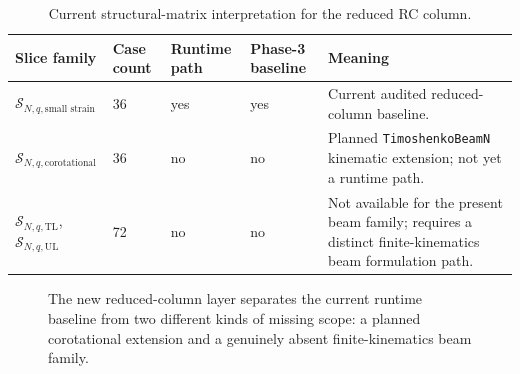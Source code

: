 \begin{table}[htbp]
  \centering
  \caption{Current structural-matrix interpretation for the reduced RC column.}
  \label{tab:reduced-rc-column-structural-matrix}
  \small
  \begin{tabular}{@{}p{}p{}p{}p{}p{}@{}}
    \toprule
    \textbf{Slice family} & \textbf{Case count} & \textbf{Runtime path} &
    \textbf{Phase-3 baseline} & \textbf{Meaning} \\
    \midrule
    \(\mathcal{S}_{N,q,\text{small strain}}\)
    & 36 & yes & yes
    & Current audited reduced-column baseline. \\

    \(\mathcal{S}_{N,q,\text{corotational}}\)
    & 36 & no & no
    & Planned \texttt{TimoshenkoBeamN} kinematic extension; not yet a runtime
      path. \\

    \(\mathcal{S}_{N,q,\text{TL}}\),
    \(\mathcal{S}_{N,q,\text{UL}}\)
    & 72 & no & no
    & Not available for the present beam family; requires a distinct
      finite-kinematics beam formulation path. \\
    \bottomrule
  \end{tabular}
\end{table}

\begin{figure}[htbp]
  \centering
  \caption{The new reduced-column layer separates the current runtime baseline
  from two different kinds of missing scope: a planned corotational extension
  and a genuinely absent finite-kinematics beam family.}
  \label{fig:reduced-rc-column-structural-matrix}
\end{figure}

